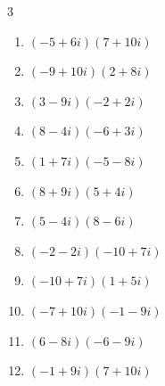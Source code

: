 \begin{multicols}{3}
\begin{enumerate}
        \phantom{$\displaystyle =60-2i$}

  \item $\displaystyle (-5+6i)(7+10i)$

        \phantom{$\displaystyle =-95-8i$}

  \item $\displaystyle (-9+10i)(2+8i)$

        \phantom{$\displaystyle =-98-52i$}

  \item $\displaystyle (3-9i)(-2+2i)$

        \phantom{$\displaystyle =12+24i$}

  \item $\displaystyle (8-4i)(-6+3i)$

        \phantom{$\displaystyle =-36+48i$}

\columnbreak %

\resetques

  \item $\displaystyle (1+7i)(-5-8i)$

        \phantom{$\displaystyle =51-43i$}

  \item $\displaystyle (8+9i)(5+4i)$

        \phantom{$\displaystyle =4+77i$}

  \item $\displaystyle (5-4i)(8-6i)$

        \phantom{$\displaystyle =16-62i$}

  \item $\displaystyle (-2-2i)(-10+7i)$

        \phantom{$\displaystyle =34+6i$}

  \item $\displaystyle (-10+7i)(1+5i)$

        \phantom{$\displaystyle =-45-43i$}

  \item $\displaystyle (-7+10i)(-1-9i)$

        \phantom{$\displaystyle =97+53i$}

  \item $\displaystyle (6-8i)(-6-9i)$

        \phantom{$\displaystyle =-108-6i$}

  \item $\displaystyle (-1+9i)(7+10i)$

        \phantom{$\displaystyle =-97+53i$}


\end{enumerate}
\end{multicols}
